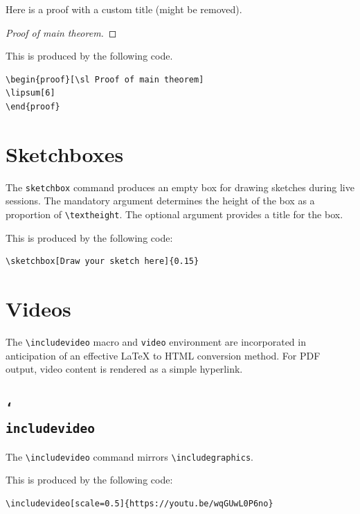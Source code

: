 \documentclass{article}
\theoremstyle{definition}
\newcommand{\vbs}{\char`\\}
\begin{document}
Here is a proof with a custom title (might be removed).
\begin{proof}[\sl Proof of main theorem]
\lipsum[6]
\end{proof}

This is produced by the following code.
\begin{Verbatim}[frame=single]
\begin{proof}[\sl Proof of main theorem]
\lipsum[6]
\end{proof}
\end{Verbatim}

\section{Sketchboxes}
The \verb+sketchbox+ command produces an empty box for drawing sketches during live sessions. The mandatory argument determines the height of the box as a proportion of \verb+\textheight+. The optional argument provides a title for the box.


This is produced by the following code:
\begin{Verbatim}[frame=single]
\sketchbox[Draw your sketch here]{0.15}
\end{Verbatim}

\section{Videos}
The \verb+\includevideo+ macro and \verb+video+ environment are incorporated in anticipation of an effective LaTeX to HTML conversion method. For PDF output, video content is rendered as a simple hyperlink.

\subsection{\tt\vbs includevideo}
The \verb+\includevideo+ command mirrors \verb+\includegraphics+. 

\bigskip
{}

\bigskip
This is produced by the following code:
\begin{Verbatim}[frame=single]
\includevideo[scale=0.5]{https://youtu.be/wqGUwL0P6no}
\end{Verbatim}
\end{document}
